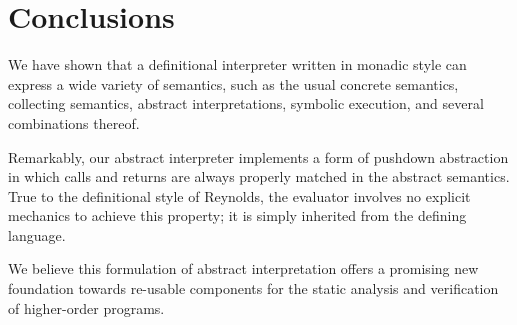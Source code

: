 \section{Conclusions}

We have shown that a definitional interpreter written in monadic style can
express a wide variety of semantics, such as the usual concrete semantics,
collecting semantics, abstract interpretations, symbolic execution, and several
combinations thereof. 

Remarkably, our abstract interpreter implements a form of pushdown abstraction
in which calls and returns are always properly matched in the abstract
semantics.  True to the definitional style of Reynolds, the evaluator involves
no explicit mechanics to achieve this property; it is simply inherited from the
defining language.

We believe this formulation of abstract interpretation offers a promising new
foundation towards re-usable components for the static analysis and
verification of higher-order programs.
